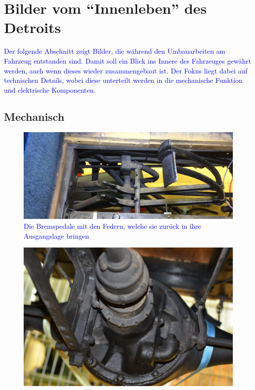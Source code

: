 \chapter{Bilder vom "`Innenleben"' des Detroits} \newpage\begin{landscape}

\textcolor{blue}{Der folgende Abschnitt zeigt Bilder, die während den Umbauarbeiten am Fahrzeug entstanden sind. Damit soll ein Blick ins Innere des Fahrzeuges gewährt werden, auch wenn dieses wieder zusammengebaut ist. Der Fokus liegt dabei auf technischen Details, wobei diese unterteilt werden in die mechanische Funktion und elektrische Komponenten.}


\section{Mechanisch}
\begin{figure}[h]
	\centering
		\includegraphics[width=1.30\textwidth]{images/Anhang/Bremspedale.jpg}
	\caption{\textcolor{blue}{Die Bremspedale mit den Federn, welche sie zurück in ihre Ausgangslage bringen}}
	\label{fig:Bremspedale}
\end{figure}
\begin{figure}[h]
	\centering
		\includegraphics[width=1.30\textwidth]{images/Anhang/Differential.jpg}

\end{figure}
\end{landscape}
